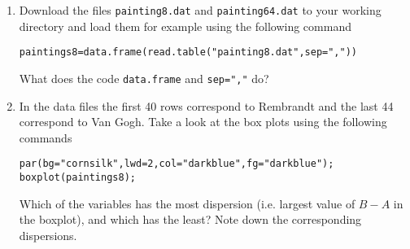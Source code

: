 \documentclass[a4paper,10pt]{article}
\begin{document}
\begin{enumerate} 
 \item Download the files \texttt{painting8.dat} and \texttt{painting64.dat} to your working directory and load them for example using the following command 
\begin{lstlisting} 
paintings8=data.frame(read.table("painting8.dat",sep=","))
\end{lstlisting}
What does the code \texttt{data.frame} and \texttt{sep=","} do? 
\item In the data files the first 40 rows correspond to Rembrandt and the last 44 correspond to Van Gogh. Take a look at the box plots using the following commands 
\begin{lstlisting} 
par(bg="cornsilk",lwd=2,col="darkblue",fg="darkblue");
boxplot(paintings8);
\end{lstlisting}
Which of the variables has the most dispersion (i.e. largest value of $B - A$ in the boxplot), and which has the least? Note down the corresponding dispersions. 


\end{enumerate}
\end{document}
